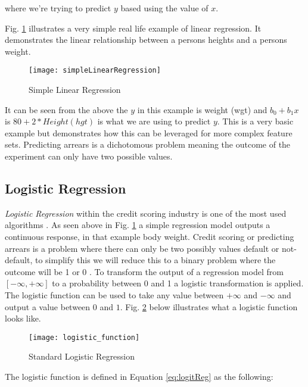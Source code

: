 where we're trying to predict $y$ based using the value of $x$.

Fig. \ref{fig:simpleLinearRegression} illustrates a very simple real life example of linear regression. It demonstrates the linear relationship between a persons heights and a persons weight.

\begin{figure}[H]
	\texttt{[image: simpleLinearRegression]}
	\caption[Confusion Matrix]
	{Simple Linear Regression}
	\label{fig:simpleLinearRegression}
\end{figure}

It can be seen from the above the $y$ in this example is weight (wgt) and $b_0 + b_1x$ is $80 + 2*Height(hgt)$ is what we are using to predict $y$. This is a very basic example but demonstrates how this can be leveraged for more complex feature sets. Predicting arrears is a dichotomous problem meaning the outcome of the experiment can only have two possible values. 

\subsection{Logistic Regression} \label{LogReg}
\textit{Logistic Regression} \cite[See:][]{hosmer_applied_2000} within the credit scoring industry is one of the most used algorithms \citep{hand_evaluating_2010}. As seen above in Fig. \ref{fig:simpleLinearRegression} a simple regression model outputs a continuous response, in that example body weight. Credit scoring or predicting arrears is a problem where there can only be two possibly values default or not-default, to simplify this we will reduce this to a binary problem where the outcome will be 1 or 0 \citep{zou_modified_2004}. To transform the output of a regression model from $[-\infty, +\infty]$ to a probability between 0 and 1 a logistic transformation is applied. The logistic function can be used to take any value between $+\infty$ and $-\infty$ and output a value between $0$ and $1$. Fig. \ref{fig:logistic_function} below illustrates what a logistic function looks like.


\begin{figure}[H]
	\texttt{[image: logistic\_function]}
	\caption[Standard Logistic Regression]
	{Standard Logistic Regression}
	\label{fig:logistic_function}
\end{figure}

The logistic function is defined in Equation \ref{eq:logitReg} as the following: 

